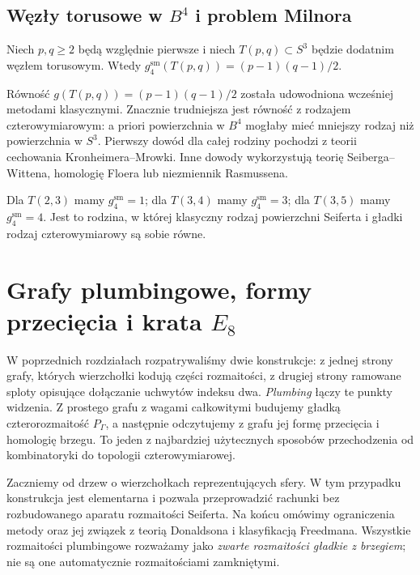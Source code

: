 \section{Węzły torusowe w \texorpdfstring{$B^4$}{B4} i problem Milnora}
\label{sec:kt-milnor}

\begin{twierdzenie}
Niech $p,q\geq2$ będą względnie pierwsze i niech
$T(p,q)\subset S^3$ będzie dodatnim węzłem torusowym.
Wtedy
$g_4^{\mathrm{sm}}(T(p,q))=(p-1)(q-1)/2$.
\end{twierdzenie}

\begin{uwaga}
Równość $g(T(p,q))=(p-1)(q-1)/2$ została udowodniona
wcześniej metodami klasycznymi. Znacznie trudniejsza
jest równość z rodzajem czterowymiarowym: a priori
powierzchnia w $B^4$ mogłaby mieć mniejszy rodzaj niż
powierzchnia w $S^3$. Pierwszy dowód dla całej rodziny
pochodzi z teorii cechowania Kronheimera--Mrowki.
Inne dowody wykorzystują teorię Seiberga--Wittena,
homologię Floera lub niezmiennik Rasmussena.
\end{uwaga}

\begin{przyklad}
Dla $T(2,3)$ mamy $g_4^{\mathrm{sm}}=1$;
dla $T(3,4)$ mamy $g_4^{\mathrm{sm}}=3$;
dla $T(3,5)$ mamy $g_4^{\mathrm{sm}}=4$.
Jest to rodzina, w której klasyczny rodzaj powierzchni
Seiferta i gładki rodzaj czterowymiarowy są sobie równe.
\end{przyklad}



\chapter{Grafy plumbingowe, formy przecięcia i krata \texorpdfstring{$E_8$}{E8}}
\label{ch:tg-plumbing}

W poprzednich rozdziałach rozpatrywaliśmy dwie konstrukcje: z jednej
strony grafy, których wierzchołki kodują części rozmaitości, z drugiej
strony ramowane sploty opisujące dołączanie uchwytów indeksu dwa.
\emph{Plumbing} łączy te punkty widzenia. Z prostego grafu z wagami
całkowitymi budujemy gładką czterorozmaitość $P_\Gamma$, a następnie
odczytujemy z grafu jej formę przecięcia i homologię brzegu.
To jeden z najbardziej użytecznych sposobów przechodzenia od
kombinatoryki do topologii czterowymiarowej.

Zaczniemy od drzew o wierzchołkach reprezentujących sfery. W tym
przypadku konstrukcja jest elementarna i pozwala przeprowadzić
rachunki bez rozbudowanego aparatu rozmaitości Seiferta. Na końcu
omówimy ograniczenia metody oraz jej związek z teorią Donaldsona
i klasyfikacją Freedmana. Wszystkie rozmaitości plumbingowe
rozważamy jako \emph{zwarte rozmaitości gładkie z brzegiem};
nie są one automatycznie rozmaitościami zamkniętymi.


